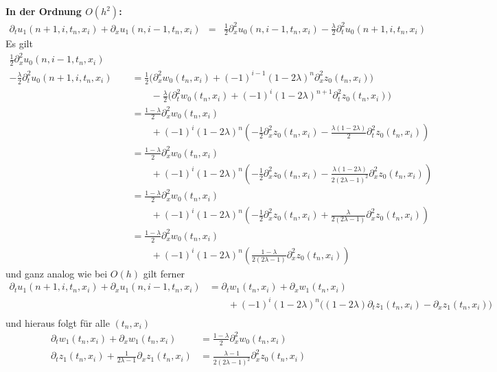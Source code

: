 \vspace{0.4cm}
\noindent \textbf{In der Ordnung $O(h^2)$:}
\begin{align*}
\partial_t u_1(n+1, i, t_n, x_i) + \partial_x u_1(n, i-1, t_n, x_i) &=
&\frac {1}{2} \partial^2_x u_0(n, i-1, t_n, x_i) - \frac{\lambda}{2} \partial^2_t u_0(n+1, i, t_n, x_i)
\end{align*}
Es gilt 
\begin{align*}
\frac {1}{2} \partial^2_x u_0(n, i-1, t_n, x_i) \qquad\\
- \frac{\lambda}{2} \partial^2_t u_0(n+1, i, t_n, x_i)
&= \frac{1}{2} \bigl( \partial^2_x w_0(t_n, x_i) + (-1)^{i-1} (1 - 2\lambda)^n \partial^2_x z_0(t_n, x_i) \bigr) \\
&\qquad - \frac{\lambda}{2} \bigl( \partial^2_t w_0(t_n, x_i) + (-1)^i (1 - 2\lambda)^{n+1} \partial^2_t z_0(t_n, x_i) \bigr)\\
&= \frac{1 - \lambda}{2}  \partial^2_x w_0(t_n, x_i)\\
&\qquad + (-1)^i (1 - 2\lambda)^{n} \left( - \frac{1}{2} \partial^2_x z_0(t_n, x_i) - \frac{\lambda (1 - 2\lambda)}{2} \partial^2_t z_0(t_n, x_i) \right)\\
&= \frac{1 - \lambda}{2}  \partial^2_x w_0(t_n, x_i)\\
&\qquad + (-1)^i (1 - 2\lambda)^{n} \left( - \frac{1}{2} \partial^2_x z_0(t_n, x_i) - \frac{\lambda (1 - 2\lambda)}{2 (2 \lambda - 1)^2} \partial^2_x z_0(t_n, x_i) \right)\\
&= \frac{1 - \lambda}{2}  \partial^2_x w_0(t_n, x_i)\\
&\qquad + (-1)^i (1 - 2\lambda)^{n} \left( - \frac{1}{2} \partial^2_x z_0(t_n, x_i) + \frac{\lambda}{2 (2 \lambda - 1)} \partial^2_x z_0(t_n, x_i) \right)\\
&= \frac{1 - \lambda}{2}  \partial^2_x w_0(t_n, x_i)\\
&\qquad + (-1)^i (1 - 2\lambda)^{n} \left( \frac{1 - \lambda}{2 (2 \lambda - 1)} \partial^2_x z_0(t_n, x_i) \right)
\end{align*}
und ganz analog wie bei $O(h)$ gilt ferner
\begin{align*}
\partial_t u_1(n+1, i, t_n, x_i) + \partial_x u_1(n, i-1, t_n, x_i) &= \partial_t w_1(t_n, x_i) + \partial_x w_1(t_n, x_i)\\
&\qquad + (-1)^i (1 - 2\lambda)^n \bigl( (1 - 2\lambda) \partial_t z_1(t_n, x_i) - \partial_x z_1(t_n, x_i) \bigr) \\
\end{align*}
und hieraus folgt für alle $(t_n, x_i)$
\begin{align*}
\partial_t w_1(t_n, x_i) + \partial_x w_1(t_n, x_i) &= \frac{1 - \lambda}{2}  \partial^2_x w_0(t_n, x_i)\\
\partial_t z_1(t_n, x_i) + \frac{1}{2 \lambda - 1} \partial_x z_1(t_n, x_i) &= \frac{\lambda - 1}{2 (2 \lambda - 1)^2} \partial^2_x z_0(t_n, x_i)
\end{align*}